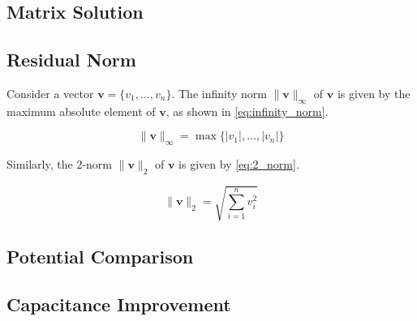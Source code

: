 \documentclass[a4paper,titlepage]{article}
\begin{document}
	\subsection{Matrix Solution}
	
	\subsection{Residual Norm}
	
	Consider a vector $\textbf{v} = \{v_1, \ldots, v_n\}$. The infinity norm $\|\textbf{v}\|_\infty$ of $\textbf{v}$ is given by the maximum absolute element of $\textbf{v}$, as shown in \cref{eq:infinity_norm}.
	
	\begin{equation} \label{eq:infinity_norm}
		\|\textbf{v}\|_\infty = \max\{|v_1|, \ldots, |v_n|\}
	\end{equation}
	
	Similarly, the 2-norm $\|\textbf{v}\|_2$ of $\textbf{v}$ is given by \cref{eq:2_norm}.
	
	\begin{equation} \label{eq:2_norm}
		\|\textbf{v}\|_2 = \sqrt{\sum_{i = 1}^{n} v_i^2}
	\end{equation}
	
	\subsection{Potential Comparison}
	
	\subsection{Capacitance Improvement}
	
%
	
	\onecolumn
	
\end{document}
